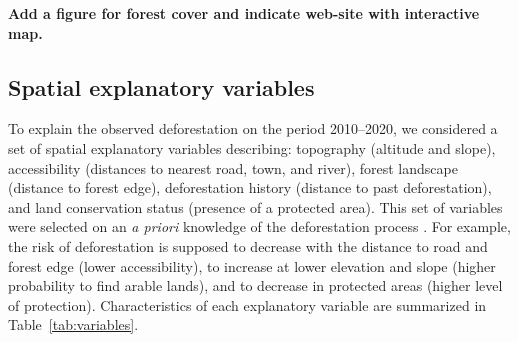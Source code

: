 \documentclass[12pt,]{article}
\begin{document}
\textbf{Add a figure for forest cover and indicate web-site with interactive map.}

\hypertarget{spatial-explanatory-variables}{%
\subsection{Spatial explanatory variables}\label{spatial-explanatory-variables}}

To explain the observed deforestation on the period 2010--2020, we considered a set of spatial explanatory variables describing: topography (altitude and slope), accessibility (distances to nearest road, town, and river), forest landscape (distance to forest edge), deforestation history (distance to past deforestation), and land conservation status (presence of a protected area). This set of variables were selected on an \emph{a priori} knowledge of the deforestation process \citep{Gorenflo2011, Vieilledent2013, Geist2001}. For example, the risk of deforestation is supposed to decrease with the distance to road and forest edge (lower accessibility), to increase at lower elevation and slope (higher probability to find arable lands), and to decrease in protected areas (higher level of protection). Characteristics of each explanatory variable are summarized in Table~\ref{tab:variables}.
\end{document}

